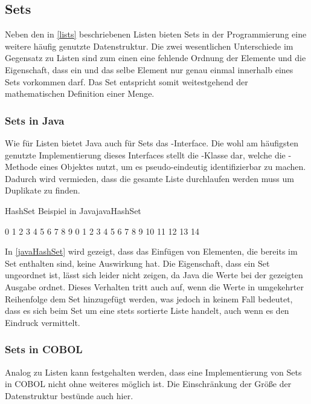 \subsection{Sets}
Neben den in \autoref{lists} beschriebenen Listen bieten Sets in der Programmierung eine weitere häufig genutzte Datenstruktur. Die zwei wesentlichen Unterschiede im Gegensatz zu Listen sind zum einen eine fehlende Ordnung der Elemente und die Eigenschaft, dass ein und das selbe Element nur genau einmal innerhalb eines Sets vorkommen darf. Das Set entspricht somit weitestgehend der mathematischen Definition einer Menge.

\subsubsection*{Sets in Java}
Wie für Listen bietet Java auch für Sets das -Interface. Die wohl am häufigsten genutzte Implementierung dieses Interfaces stellt die -Klasse dar, welche die -Methode eines Objektes nutzt, um es pseudo-eindeutig identifizierbar zu machen. Dadurch wird vermieden, dass die gesamte Liste durchlaufen werden muss um Duplikate zu finden.

\begin{codeWithCaption}{HashSet Beispiel in Java}{javaHashSet}
\begin{shellwindow}
0 1 2 3 4 5 6 7 8 9 
0 1 2 3 4 5 6 7 8 9 10 11 12 13 14 
\end{shellwindow}
\end{codeWithCaption}

In \autoref{javaHashSet} wird gezeigt, dass das Einfügen von Elementen, die bereits im Set enthalten sind, keine Auswirkung hat. Die Eigenschaft, dass ein Set ungeordnet ist, lässt sich leider nicht zeigen, da Java die Werte bei der gezeigten Ausgabe ordnet. Dieses Verhalten tritt auch auf, wenn die Werte in umgekehrter Reihenfolge dem Set hinzugefügt werden, was jedoch in keinem Fall bedeutet, dass es sich beim Set um eine stets sortierte Liste handelt, auch wenn es den Eindruck vermittelt.

\subsubsection*{Sets in COBOL}
Analog zu Listen kann festgehalten werden, dass eine Implementierung von Sets in COBOL nicht ohne weiteres möglich ist. Die Einschränkung der Größe der Datenstruktur bestünde auch hier. 

